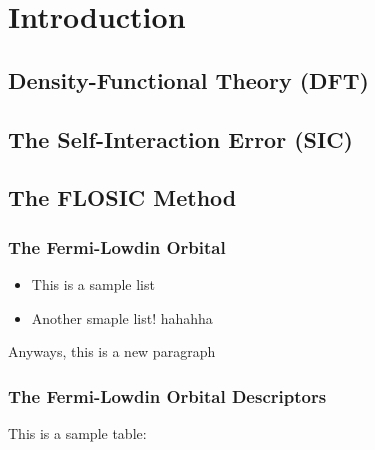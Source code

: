 \documentclass[12pt,a4paper,]{report}
\providecommand{\tightlist}{%
  \setlength{\itemsep}{0pt}\setlength{\parskip}{0pt}}
\begin{document}
\chapter{Introduction}\label{introduction}

\section{Density-Functional Theory
(DFT)}\label{density-functional-theory-dft}

\section{The Self-Interaction Error
(SIC)}\label{the-self-interaction-error-sic}

\section{The FLOSIC Method}\label{the-flosic-method}

\subsection{The Fermi-Lowdin Orbital}\label{the-fermi-lowdin-orbital}

\begin{itemize}
\tightlist
\item
  This is a sample list
\item
  Another smaple list! hahahha
\end{itemize}

Anyways, this is a new paragraph

\subsection{The Fermi-Lowdin Orbital
Descriptors}\label{the-fermi-lowdin-orbital-descriptors}

This is a sample table:
\end{document}
